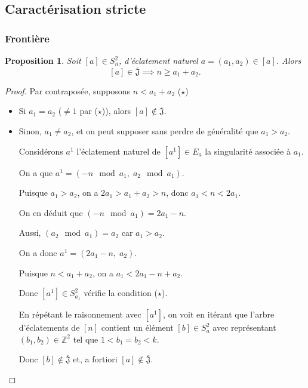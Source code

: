 \documentclass{article}
\newtheorem{proposition}{Proposition}
\newcommand{\J}{\mathfrak{J}}
\newcommand{\JS}{\overline{\J}}
\begin{document}
\newpage

\subsection{Caractérisation stricte}

\subsubsection{Frontière}

\begin{proposition}
    Soit $[a] \in S_n^2$, d'éclatement naturel $a = (a_1, a_2) \in [a]$. Alors
    \[ [a] \in \JS \implies n \geq a_1 + a_2. \]
\end{proposition} 

\begin{proof}
    Par contraposée, supposons $n < a_1 + a_2$ ($\star$)

    \begin{itemize}
        \item Si $a_1 = a_2$ ($\neq 1$ par ($\star$)), alors $[a] \not \in \JS$.
        \item Sinon, $a_1 \neq a_2$, et on peut supposer sans perdre de généralité que $a_1 > a_2$.

            Considérons $a^1$ l'éclatement naturel de $[a^1] \in E_a$ la singularité associée à $a_1$.

            On a que $a^1 = (-n \mod a_1,\; a_2 \mod a_1)$.

            Puisque $a_1 > a_2$, on a $2a_1 > a_1 + a_2 > n$, donc $a_1 < n < 2a_1$.
                
            On en déduit que $(-n \mod a_1) = 2a_1 - n$.

            Aussi, $(a_2 \mod a_1) = a_2$ car $a_1 > a_2$.

            On a donc $a^1 = (2a_1-n,\; a_2)$.

            Puisque $n < a_1 + a_2$, on a $a_1 < 2a_1 - n + a_2$.

            Donc $[a^1] \in S_{a_1}^2$ vérifie la condition ($\star$). 
            
            En répétant le raisonnement avec $[a^1]$, 
            on voit en itérant que l'arbre d'éclatements de $[n]$ 
            contient un élément $[b] \in S_a^2$ avec représentant 
            $(b_1, b_2) \in \mathbb{Z}^2$ tel que $1 < b_1 = b_2 < k$.

            Donc $[b] \not \in \JS$ et, a fortiori $[a] \not \in \JS$.
    \end{itemize}
\end{proof}
\end{document}
